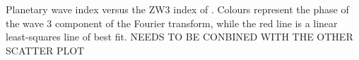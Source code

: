 \label{fig:metric_vs_zw3}
Planetary wave index versus the ZW3 index of \citet{Raphael2004}. Colours represent the phase of the wave 3 component of the Fourier transform, while the red line is a linear least-squares line of best fit. NEEDS TO BE CONBINED WITH THE OTHER SCATTER PLOT